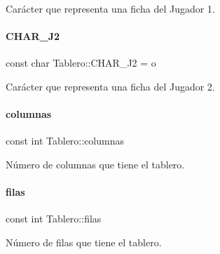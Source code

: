 Carácter que representa una ficha del Jugador 1. 

\hypertarget{classTablero_afa16f5041be0f6cc7b0a55e502b89c53}{}\label{classTablero_afa16f5041be0f6cc7b0a55e502b89c53} 
\paragraph{\texorpdfstring{C\+H\+A\+R\+\_\+\+J2}{CHAR\_J2}}
{\footnotesize\ttfamily const char Tablero\+::\+C\+H\+A\+R\+\_\+\+J2 = \textquotesingle{}o\textquotesingle{}\hspace{0.3cm}{\ttfamily [static]}}



Carácter que representa una ficha del Jugador 2. 

\hypertarget{classTablero_ac70289ec91b44d05da648770cc46801d}{}\label{classTablero_ac70289ec91b44d05da648770cc46801d} 
\paragraph{\texorpdfstring{columnas}{columnas}}
{\footnotesize\ttfamily const int Tablero\+::columnas\hspace{0.3cm}{\ttfamily [private]}}



Número de columnas que tiene el tablero. 

\hypertarget{classTablero_a6b1f04a8502106c33bf5469f791320e6}{}\label{classTablero_a6b1f04a8502106c33bf5469f791320e6} 
\paragraph{\texorpdfstring{filas}{filas}}
{\footnotesize\ttfamily const int Tablero\+::filas\hspace{0.3cm}{\ttfamily [private]}}



Número de filas que tiene el tablero. 

\hypertarget{classTablero_aa38ed353bef45bd6c5a2e3aa4a897720}{}\label{classTablero_aa38ed353bef45bd6c5a2e3aa4a897720} 
